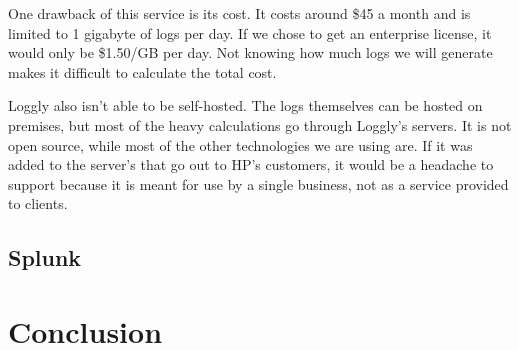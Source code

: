 \documentclass[onecolumn, draftclsnofoot,10pt, compsoc]{IEEEtran}
\begin{document}
One drawback of this service is its cost.
It costs around \$45 a month and is limited to 1 gigabyte of logs per day.
If we chose to get an enterprise license, it would only be \$1.50/GB per day.
Not knowing how much logs we will generate makes it difficult to calculate the total cost.

Loggly also isn’t able to be self-hosted.
The logs themselves can be hosted on premises, but most of the heavy calculations go through Loggly’s servers.
It is not open source, while most of the other technologies we are using are.
If it was added to the server’s that go out to HP’s customers, it would be a headache to support because it is meant for use by a single business, not as a service provided to clients.

\subsection{Splunk}


\section{Conclusion}
\end{document}
